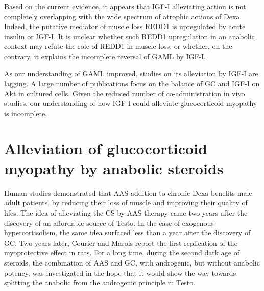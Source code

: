 \documentclass[12pt,english]{report}\usepackage[]{graphicx}\usepackage[]{color}
\begin{document}
Based on the current evidence, it appears that IGF-I alleviating action
is not completely overlapping with the wide spectrum of atrophic actions
of Dexa. Indeed, the putative mediator of muscle loss REDD1 is upregulated
by acute insulin or IGF-I\citep{frost2009regulation}. It is unclear
whether such REDD1 upregulation in an anabolic context may refute
the role of REDD1 in muscle loss, or whether, on the contrary, it
explains the incomplete reversal of GAML by IGF-I.

As our understanding of GAML improved, studies on its alleviation
by IGF-I are lagging. A large number of publications focus on the
balance of GC and IGF-I on Akt in cultured cells. Given the reduced
number of co-administration in vivo studies, our understanding of
how IGF-I could alleviate glucocorticoid myopathy is incomplete.


\section{Alleviation of glucocorticoid myopathy by anabolic steroids}

Human studies demonstrated that AAS addition to chronic Dexa benefits
male adult patients, by reducing their loss of muscle and improving
their quality of lifes\citep{crawford2003randomized}. The idea of
alleviating the CS by AAS therapy came two years after the discovery
of an affordable source of Testo. In the case of exogenous hypercortisolism,
the same idea surfaced less than a year after the discovery of GC.
Two years later, Courier and Marois report the first replication of
the myoprotective effect in rats\citep{courrier1952relations}. For
a long time, during the second dark age of steroids, the combination
of AAS and GC, with androgenic, but without anabolic potency, was
investigated in the hope that it would show the way towards splitting
the anabolic from the androgenic principle in Testo.
\end{document}
